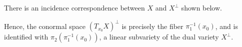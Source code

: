 \documentclass[12pt]{amsart}
\newtheorem{lemma}[theorem]{Lemma}
\newtheorem{remark}[theorem]{Remark}
\begin{document}
There is an incidence correspondence between $X$ and $X^{\perp}$ shown below.

\begin{figure}[ht]
    \centering
\end{figure}
Hence, the conormal space $(T_{x_0}X)^{\perp}$ is precisely the fiber $\pi_1^{-1}(x_0)$, and is identified with $\pi_2(\pi_1^{-1}(x_0))$, a linear subvariety of the dual variety $X^{\perp}$. 

\end{document}
